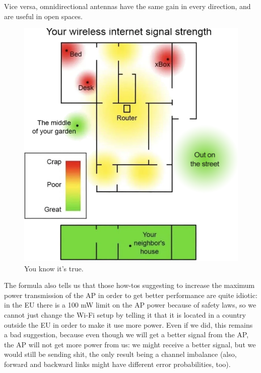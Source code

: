 Vice versa, omnidirectional antennas have the same gain in every direction, and are useful in open spaces.

\vspace{0.5em}

\begin{figure}[h]
    \centering
    \includegraphics[scale=0.5]{img/wifi_signal.png}
    \decoRule
    \caption{You know it's true.}
    \label{fig:meme_wifi_signal}
\end{figure}

The formula also tells us that those how-tos suggesting to increase the maximum power transmission of the AP in order to get better performance are quite idiotic: in the EU there is a 100 mW limit on the AP power because of safety laws, so we cannot just change the Wi-Fi setup by telling it that it is located in a country outside the EU in order to make it use more power. Even if we did, this remains a bad suggestion, because even though we will get a better signal from the AP, the AP will not get more power from us: we might receive a better signal, but we would still be sending shit, the only result being a channel imbalance (also, forward and backward links might have different error probabilities, too).

